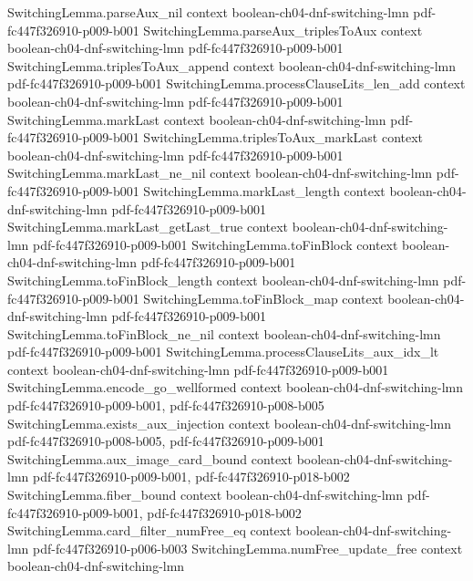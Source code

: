 \begin{theorem}
\proofstep
  {SwitchingLemma.parseAux_nil}
  {context}
  {boolean-ch04-dnf-switching-lmn}
  {pdf-fc447f326910-p009-b001}
\proofstep
  {SwitchingLemma.parseAux_triplesToAux}
  {context}
  {boolean-ch04-dnf-switching-lmn}
  {pdf-fc447f326910-p009-b001}
\proofstep
  {SwitchingLemma.triplesToAux_append}
  {context}
  {boolean-ch04-dnf-switching-lmn}
  {pdf-fc447f326910-p009-b001}
\proofstep
  {SwitchingLemma.processClauseLits_len_add}
  {context}
  {boolean-ch04-dnf-switching-lmn}
  {pdf-fc447f326910-p009-b001}
\proofstep
  {SwitchingLemma.markLast}
  {context}
  {boolean-ch04-dnf-switching-lmn}
  {pdf-fc447f326910-p009-b001}
\proofstep
  {SwitchingLemma.triplesToAux_markLast}
  {context}
  {boolean-ch04-dnf-switching-lmn}
  {pdf-fc447f326910-p009-b001}
\proofstep
  {SwitchingLemma.markLast_ne_nil}
  {context}
  {boolean-ch04-dnf-switching-lmn}
  {pdf-fc447f326910-p009-b001}
\proofstep
  {SwitchingLemma.markLast_length}
  {context}
  {boolean-ch04-dnf-switching-lmn}
  {pdf-fc447f326910-p009-b001}
\proofstep
  {SwitchingLemma.markLast_getLast_true}
  {context}
  {boolean-ch04-dnf-switching-lmn}
  {pdf-fc447f326910-p009-b001}
\proofstep
  {SwitchingLemma.toFinBlock}
  {context}
  {boolean-ch04-dnf-switching-lmn}
  {pdf-fc447f326910-p009-b001}
\proofstep
  {SwitchingLemma.toFinBlock_length}
  {context}
  {boolean-ch04-dnf-switching-lmn}
  {pdf-fc447f326910-p009-b001}
\proofstep
  {SwitchingLemma.toFinBlock_map}
  {context}
  {boolean-ch04-dnf-switching-lmn}
  {pdf-fc447f326910-p009-b001}
\proofstep
  {SwitchingLemma.toFinBlock_ne_nil}
  {context}
  {boolean-ch04-dnf-switching-lmn}
  {pdf-fc447f326910-p009-b001}
\proofstep
  {SwitchingLemma.processClauseLits_aux_idx_lt}
  {context}
  {boolean-ch04-dnf-switching-lmn}
  {pdf-fc447f326910-p009-b001}
\proofstep
  {SwitchingLemma.encode_go_wellformed}
  {context}
  {boolean-ch04-dnf-switching-lmn}
  {pdf-fc447f326910-p009-b001,
    pdf-fc447f326910-p008-b005}
\proofstep
  {SwitchingLemma.exists_aux_injection}
  {context}
  {boolean-ch04-dnf-switching-lmn}
  {pdf-fc447f326910-p008-b005,
    pdf-fc447f326910-p009-b001}
\proofstep
  {SwitchingLemma.aux_image_card_bound}
  {context}
  {boolean-ch04-dnf-switching-lmn}
  {pdf-fc447f326910-p009-b001,
    pdf-fc447f326910-p018-b002}
\proofstep
  {SwitchingLemma.fiber_bound}
  {context}
  {boolean-ch04-dnf-switching-lmn}
  {pdf-fc447f326910-p009-b001,
    pdf-fc447f326910-p018-b002}
\proofstep
  {SwitchingLemma.card_filter_numFree_eq}
  {context}
  {boolean-ch04-dnf-switching-lmn}
  {pdf-fc447f326910-p006-b003}
\proofstep
  {SwitchingLemma.numFree_update_free}
  {context}
  {boolean-ch04-dnf-switching-lmn}

\end{theorem}
